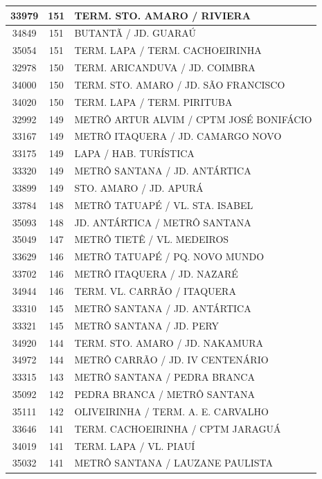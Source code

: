 \documentclass[
	12pt,				%
	oneside,			%
	a4paper,			%
	english,			%
	brazil				%
	]{abntex2ppgsi}
\begin{document}
{{\begin{apendicesenv}
\begin{longtable}{c|c|p{7cm}}
 \hline 
33979 &	151 &	TERM. STO. AMARO / RIVIERA \\ 
 \hline 
34849 &	151 &	BUTANTÃ / JD. GUARAÚ \\ 
 \hline 
35054 &	151 &	TERM. LAPA / TERM. CACHOEIRINHA \\ 
 \hline 
32978 &	150 &	TERM. ARICANDUVA / JD. COIMBRA \\ 
 \hline 
34000 &	150 &	TERM. STO. AMARO / JD. SÃO FRANCISCO \\ 
 \hline 
34020 &	150 &	TERM. LAPA / TERM. PIRITUBA \\ 
 \hline 
32992 &	149 &	METRÔ ARTUR ALVIM / CPTM JOSÉ BONIFÁCIO \\ 
 \hline 
33167 &	149 &	METRÔ ITAQUERA / JD. CAMARGO NOVO \\ 
 \hline 
33175 &	149 &	LAPA / HAB. TURÍSTICA \\ 
 \hline 
33320 &	149 &	METRÔ SANTANA / JD. ANTÁRTICA \\ 
 \hline 
33899 &	149 &	STO. AMARO / JD. APURÁ \\ 
 \hline 
33784 &	148 &	METRÔ TATUAPÉ / VL. STA. ISABEL \\ 
 \hline 
35093 &	148 &	JD. ANTÁRTICA / METRÔ SANTANA \\ 
 \hline 
35049 &	147 &	METRÔ TIETÊ / VL. MEDEIROS \\ 
 \hline 
33629 &	146 &	METRÔ TATUAPÉ / PQ. NOVO MUNDO \\ 
 \hline 
33702 &	146 &	METRÔ ITAQUERA / JD. NAZARÉ \\ 
 \hline 
34944 &	146 &	TERM. VL. CARRÃO / ITAQUERA \\ 
 \hline 
33310 &	145 &	METRÔ SANTANA / JD. ANTÁRTICA \\ 
 \hline 
33321 &	145 &	METRÔ SANTANA / JD. PERY \\ 
 \hline 
34920 &	144 &	TERM. STO. AMARO / JD. NAKAMURA \\ 
 \hline 
34972 &	144 &	METRÔ CARRÃO / JD. IV CENTENÁRIO \\ 
 \hline 
33315 &	143 &	METRÔ SANTANA / PEDRA BRANCA \\ 
 \hline 
35092 &	142 &	PEDRA BRANCA / METRÔ SANTANA \\ 
 \hline 
35111 &	142 &	OLIVEIRINHA / TERM. A. E. CARVALHO \\ 
 \hline 
33646 &	141 &	TERM. CACHOEIRINHA / CPTM JARAGUÁ \\ 
 \hline 
34019 &	141 &	TERM. LAPA / VL. PIAUÍ \\ 
 \hline 
35032 &	141 &	METRÔ SANTANA / LAUZANE PAULISTA \\ 

\end{longtable}
\end{apendicesenv}}}
\end{document}
